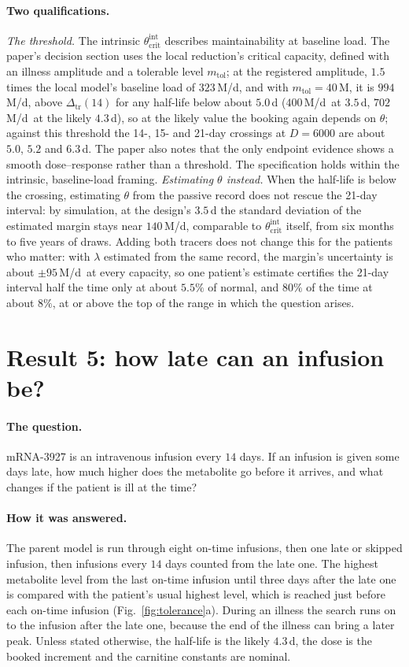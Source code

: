 \documentclass[11pt,a4paper]{article}
\newcommand{\thci}{\theta_{\mathrm{crit}}^{\mathrm{int}}}
\newcommand{\dtr}{\Delta_{\mathrm{tr}}}
\newcommand{\um}{\,\textmu M/d}
\begin{document}
\paragraph{Two qualifications.} \emph{The threshold.} The intrinsic $\thci$ describes
maintainability at baseline load. The paper's decision section uses the local reduction's
critical capacity, defined with an illness amplitude and a tolerable level $m_{\mathrm{tol}}$;
at the registered amplitude, $1.5$ times the local model's baseline load of $323$\um, and with
$m_{\mathrm{tol}}=40$\,\textmu M, it is $994$\um, above $\dtr(14)$ for any half-life below about
$5.0$\,d ($400$\um\ at $3.5$\,d, $702$\um\ at the likely $4.3$\,d), so at the likely value the
booking again depends on $\theta$; against this threshold the 14-, 15- and 21-day crossings at
$D=6000$ are about $5.0$, $5.2$ and $6.3$\,d. The paper also notes that the only endpoint evidence shows a smooth
dose--response rather than a threshold. The specification holds within the intrinsic,
baseline-load framing. \emph{Estimating $\theta$ instead.} When the half-life is below the
crossing, estimating $\theta$ from the passive record does not rescue the 21-day interval: by
simulation, at the design's $3.5$\,d the standard deviation of the estimated margin stays near
$140$\um, comparable to $\thci$ itself, from six months to five years of draws. Adding both
tracers does not change this for the patients who matter: with $\lambda$ estimated from the
same record, the margin's uncertainty is about $\pm95$\um\ at every capacity, so one patient's
estimate certifies the 21-day interval half the time only at about $5.5\%$ of normal, and $80\%$
of the time at about $8\%$, at or above the top of the range in which the question arises.

\section{Result 5: how late can an infusion be?}

\paragraph{The question.} mRNA-3927 is an intravenous infusion every $14$ days. If an infusion
is given some days late, how much higher does the metabolite go before it arrives, and what
changes if the patient is ill at the time?

\paragraph{How it was answered.} The parent model is run through eight on-time infusions, then
one late or skipped infusion, then infusions every $14$ days counted from the late one. The
highest metabolite level from the last on-time infusion until three days after the late one is
compared with the patient's usual highest level, which is reached just before each on-time
infusion (Fig.~\ref{fig:tolerance}a). During an illness the search runs on to the infusion after
the late one, because the end of the illness can bring a later peak. Unless stated otherwise,
the half-life is the likely $4.3$\,d, the dose is the booked increment and the carnitine
constants are nominal.
\end{document}
